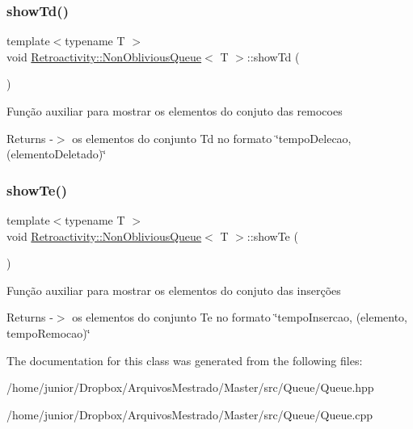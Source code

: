 \subsubsection{\texorpdfstring{show\+Td()}{showTd()}}
{\footnotesize\ttfamily template$<$typename T $>$ \\
void \hyperlink{classRetroactivity_1_1NonObliviousQueue}{Retroactivity\+::\+Non\+Oblivious\+Queue}$<$ T $>$\+::show\+Td (\begin{DoxyParamCaption}{ }\end{DoxyParamCaption})}

Função auxiliar para mostrar os elementos do conjuto das remocoes

\begin{DoxyReturn}{Returns}
-\/$>$ os elementos do conjunto Td no formato \char`\"{}tempo\+Delecao, (elemento\+Deletado)\char`\"{} 
\end{DoxyReturn}
\mbox{\label{classRetroactivity_1_1NonObliviousQueue_a4682494399cc4da59dcef0d0cbb1df14}} 
\subsubsection{\texorpdfstring{show\+Te()}{showTe()}}
{\footnotesize\ttfamily template$<$typename T $>$ \\
void \hyperlink{classRetroactivity_1_1NonObliviousQueue}{Retroactivity\+::\+Non\+Oblivious\+Queue}$<$ T $>$\+::show\+Te (\begin{DoxyParamCaption}{ }\end{DoxyParamCaption})}

Função auxiliar para mostrar os elementos do conjuto das inserções

\begin{DoxyReturn}{Returns}
-\/$>$ os elementos do conjunto Te no formato \char`\"{}tempo\+Insercao, (elemento, tempo\+Remocao)\char`\"{} 
\end{DoxyReturn}


The documentation for this class was generated from the following files\+:\begin{DoxyCompactItemize}
\item 
/home/junior/\+Dropbox/\+Arquivos\+Mestrado/\+Master/src/\+Queue/Queue.\+hpp\item 
/home/junior/\+Dropbox/\+Arquivos\+Mestrado/\+Master/src/\+Queue/Queue.\+cpp\end{DoxyCompactItemize}
